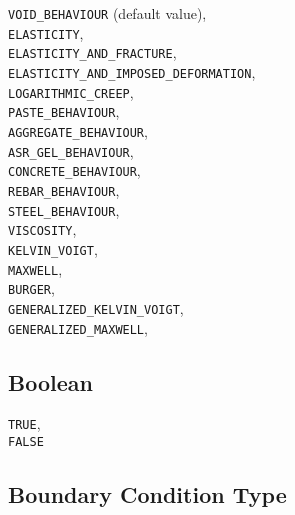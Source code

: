 \documentclass[10pt]{article}
\begin{document}
	\verb+VOID_BEHAVIOUR+ (default value),\\
	\verb+ELASTICITY+,\\
	\verb+ELASTICITY_AND_FRACTURE+,\\
	\verb+ELASTICITY_AND_IMPOSED_DEFORMATION+,\\
	\verb+LOGARITHMIC_CREEP+,\\
	\verb+PASTE_BEHAVIOUR+,\\
	\verb+AGGREGATE_BEHAVIOUR+,\\
	\verb+ASR_GEL_BEHAVIOUR+,\\
	\verb+CONCRETE_BEHAVIOUR+,\\
	\verb+REBAR_BEHAVIOUR+,\\
	\verb+STEEL_BEHAVIOUR+,\\
	\verb+VISCOSITY+,\\
	\verb+KELVIN_VOIGT+,\\
	\verb+MAXWELL+,\\
	\verb+BURGER+,\\
	\verb+GENERALIZED_KELVIN_VOIGT+,\\
	\verb+GENERALIZED_MAXWELL+,\\
	
\subsection{Boolean}
	\verb+TRUE+,\\
	\verb+FALSE+


\subsection{Boundary Condition Type}
\end{document}
